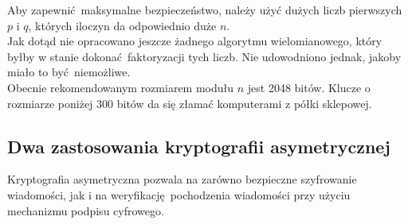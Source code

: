 \documentclass[12pt]{article}
\begin{document}
Aby zapewnić maksymalne bezpieczeństwo, należy użyć
dużych liczb pierwszych $p$ i $q$, których iloczyn da
odpowiednio duże $n$.
\\

Jak dotąd nie opracowano jeszcze żadnego algorytmu wielomianowego,
który byłby w stanie dokonać faktoryzacji tych liczb.
Nie udowodniono jednak, jakoby miało to być niemożliwe.
\\

Obecnie rekomendowanym rozmiarem modułu $n$ jest 2048 bitów.
Klucze o rozmiarze poniżej 300 bitów da się złamać
komputerami z półki sklepowej.

\subsection{Dwa zastosowania kryptografii asymetrycznej}

Kryptografia asymetryczna pozwala na zarówno bezpieczne szyfrowanie wiadomości,
jak i na weryfikację pochodzenia wiadomości przy użyciu mechanizmu podpisu
cyfrowego.
\end{document}
